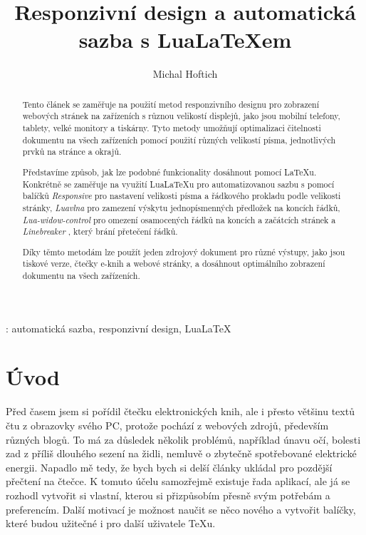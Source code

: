 \documentclass{csbulletin}
\newcommand\balicek[1]{\textit{#1}}
\begin{document}
\title{Responzivní design a automatická sazba s Lua\LaTeX em}
\author{Michal Hoftich}
\maketitle

\begin{abstract}
Tento článek se zaměřuje na použití metod responzivního designu pro zobrazení
webových stránek na zařízeních s různou velikostí displejů, jako jsou mobilní
telefony, tablety, velké monitory a tiskárny. Tyto metody umožňují optimalizaci
čitelnosti dokumentu na všech zařízeních pomocí použití různých velikostí
písma, jednotlivých prvků na stránce a okrajů.

Představíme způsob, jak lze podobné funkcionality dosáhnout
pomocí \LaTeX u. Konkrétně se zaměřuje na využití Lua\LaTeX u pro automatizovanou
sazbu s pomocí balíčků \balicek{Responsive}\cite{responsive} pro nastavení velikosti písma a řádkového prokladu
podle velikosti stránky, \balicek{Luavlna} \cite{luavlna} pro zamezení výskytu jednopísmenných předložek
na koncích řádků, \balicek{Lua-widow-control}  \cite{lua-widow-control} pro omezení osamocených řádků na koncích a
začátcích stránek a \balicek{Linebreaker} \cite{linebreaker}, který brání přetečení řádků.

Díky těmto metodám lze použít jeden zdrojový dokument pro různé výstupy, jako
jsou tiskové verze, čtečky e-knih a webové stránky, a dosáhnout optimálního
zobrazení dokumentu na všech zařízeních.
\end{abstract}
\klicovaslova: automatická sazba, responzivní design, Lua\LaTeX


\section{Úvod}

Před časem jsem si pořídil čtečku elektronických knih, ale i přesto většinu
textů čtu z obrazovky svého PC, protože pochází z webových zdrojů, především 
různých blogů. To má za důsledek několik problémů, například únavu očí, bolesti zad
z příliš dlouhého sezení na židli, nemluvě o zbytečně spotřebované elektrické
energii. Napadlo mě tedy, že bych bych si delší články ukládal pro pozdější
přečtení na čtečce. K tomuto účelu samozřejmě existuje řada aplikací, ale 
já se rozhodl vytvořit si vlastní, kterou si přizpůsobím přesně svým potřebám
a preferencím. Další motivací je možnost naučit se něco nového a vytvořit
balíčky, které budou užitečné i pro další uživatele \TeX u. 
\end{document}
